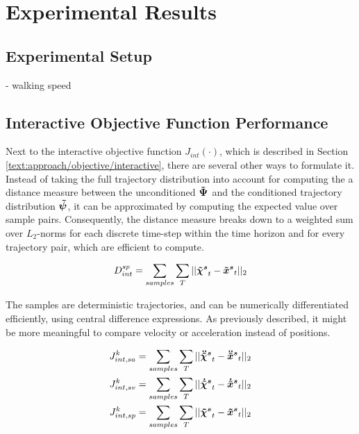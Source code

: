 \section{Experimental Results}
\label{text:experiments/results}

\subsection{Experimental Setup}
- walking speed \cite{Bohannon1997}


\subsection{Interactive Objective Function Performance}
Next to the interactive objective function $J_{int}(\cdot)$, which is described in Section \ref{text:approach/objective/interactive}, there are several other ways to formulate it. Instead of taking the full trajectory distribution into account for computing the a distance measure between the unconditioned $\distwo[]$ and the conditioned trajectory distribution $\dist[]$, it can be approximated by computing the expected value over sample pairs. Consequently, the distance measure breaks down to a weighted sum over $L_2$-norms for each discrete time-step within the time horizon and for every trajectory pair, which are efficient to compute.

\begin{equation}
D_{int}^{sp} = \sum_{samples} \sum_T ||\xpedwo[s]_t - \xped[s]_t||_2
\end{equation}

The samples are deterministic trajectories, and can be numerically differentiated efficiently, using central difference expressions. As previously described, it might be more meaningful to compare velocity or acceleration instead of positions.

\begin{align}
J_{int, sa}^{k} &= \sum_{samples} \sum_T ||\ddxpedwo[s]_t - \ddxped[s]_t||_2	 \\
J_{int, sv}^{k} &= \sum_{samples} \sum_T ||\dxpedwo[s]_t - \dxped[s]_t||_2	 \\
J_{int, sp}^{k} &= \sum_{samples} \sum_T ||\xpedwo[s]_t - \xped[s]_t||_2
\label{eq:interaction_diff}	
\end{align}


